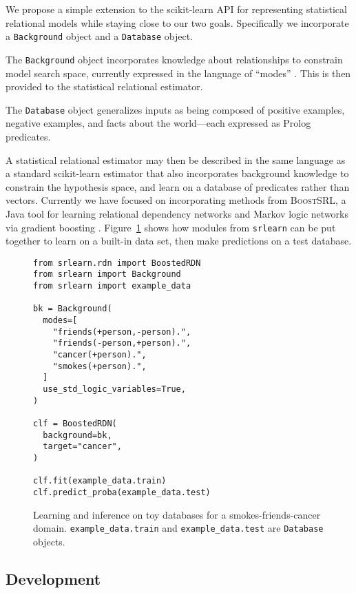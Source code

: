 \documentclass[letterpaper]{article}
\begin{document}
We propose a simple extension to the scikit-learn API for representing
statistical relational models while staying close to our two goals.
Specifically we incorporate a \texttt{Background} object and a
\texttt{Database} object.

The \texttt{Background} object incorporates knowledge about relationships
to constrain model search space, currently expressed in the language
of ``modes'' \cite{srinivasan2004aleph}. This is then provided
to the statistical relational estimator.

The \texttt{Database} object generalizes inputs as being composed of
positive examples, negative examples, and facts about the world---each
expressed as Prolog predicates.

A statistical relational estimator may then be described in the same
language as a standard scikit-learn estimator that also incorporates
background knowledge to constrain the hypothesis space, and learn
on a database of predicates rather than vectors. Currently
we have focused on incorporating methods from \textsc{BoostSRL}, a Java tool
for learning relational dependency networks and Markov
logic networks via gradient boosting \cite{natarajan2018human}.
Figure~\ref{minted:smokes_friends_cancer} shows how modules from \texttt{srlearn}
can be put together to learn on a built-in data set, then make
predictions on a test database.

\begin{figure}
\begin{verbatim}
from srlearn.rdn import BoostedRDN
from srlearn import Background
from srlearn import example_data

bk = Background(
  modes=[
    "friends(+person,-person).",
    "friends(-person,+person).",
    "cancer(+person).",
    "smokes(+person).",
  ]
  use_std_logic_variables=True,
)

clf = BoostedRDN(
  background=bk,
  target="cancer",
)

clf.fit(example_data.train)
clf.predict_proba(example_data.test)
\end{verbatim}
\caption{
Learning and inference on toy databases for a smokes-friends-cancer domain.
\texttt{example\_data.train} and \texttt{example\_data.test} are \texttt{Database} objects.
}
\label{minted:smokes_friends_cancer}
\end{figure}

\subsection{Development}
\end{document}
